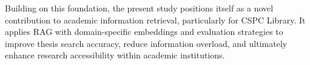 \begin{refsection}
Building on this foundation, the present study positions itself as a novel contribution to academic information retrieval, particularly for CSPC Library. It applies RAG with domain-specific embeddings and evaluation strategies to improve thesis search accuracy, reduce information overload, and ultimately enhance research accessibility within academic institutions.




\end{refsection}
